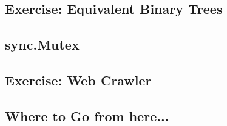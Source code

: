 \subsection{Exercise: Equivalent Binary Trees}


% 

\subsection{sync.Mutex}




\subsection{Exercise: Web Crawler}


% 

\subsection{Where to Go from here...}
